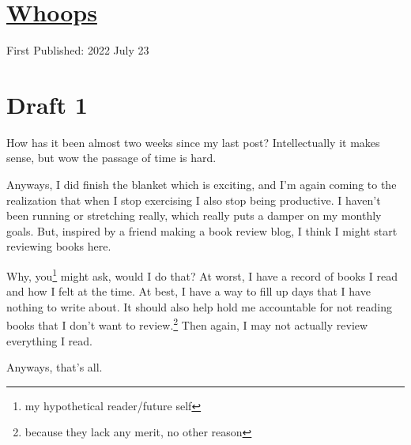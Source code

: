 \documentclass[12pt]{article}[titlepage]
\newcommand{\1}{\={a}}
\newcommand{\2}{\={e}}
\newcommand{\3}{\={\i}}
\newcommand{\4}{\=o}
\newcommand{\5}{\=u}
\newcommand{\6}{\={A}}
\renewcommand{\,}{\textsuperscript{,}}
\begin{document}
\doublespacing
\section{\href{whoops-4.html}{Whoops}}
First Published: 2022 July 23

\section{Draft 1}
How has it been almost two weeks since my last post?
Intellectually it makes sense, but wow the passage of time is hard.

Anyways, I did finish the blanket which is exciting, and I'm again coming to the realization that when I stop exercising I also stop being productive.
I haven't been running or stretching really, which really puts a damper on my monthly goals.
But, inspired by a friend making a book review blog, I think I might start reviewing books here.

Why, you\footnote{my hypothetical reader/future self} might ask, would I do that?
At worst, I have a record of books I read and how I felt at the time.
At best, I have a way to fill up days that I have nothing to write about.
It should also help hold me accountable for not reading books that I don't want to review.\footnote{because they lack any merit, no other reason}
Then again, I may not actually review everything I read.

Anyways, that's all.
\end{document}
